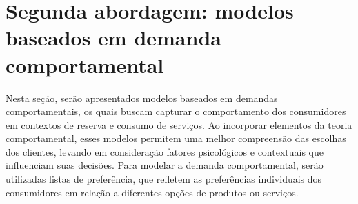 





\section{Segunda abordagem: modelos baseados em demanda comportamental} \label{sec: modelagemComportamental}
Nesta seção, serão apresentados modelos baseados em demandas comportamentais, os quais buscam capturar o comportamento dos consumidores em contextos de reserva e consumo de serviços. Ao incorporar elementos da teoria comportamental, esses modelos permitem uma melhor compreensão das escolhas dos clientes, levando em consideração fatores psicológicos e contextuais que influenciam suas decisões. Para modelar a demanda comportamental, serão utilizadas listas de preferência, que refletem as preferências individuais dos consumidores em relação a diferentes opções de produtos ou serviços.

